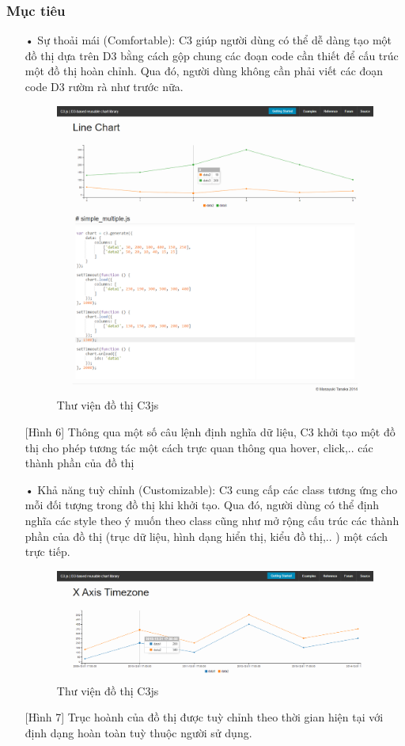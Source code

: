 \documentclass[12pt,a4paper,oneside]{article}
\begin{document}
\subsubsection{Mục tiêu}
\begin{itemize}
        \item[•]Sự thoải mái (Comfortable):
        C3 giúp người dùng có thể dễ dàng tạo một đồ thị dựa trên D3 bằng cách gộp chung các đoạn code cần thiết để cấu trúc một đồ thị hoàn chỉnh. Qua đó, người dùng không cần phải viết các đoạn code D3 rườm rà như trước nữa.
\begin{figure}[htp]
    \includegraphics[scale=.3]{image/c3syntax}
    \caption{Thư viện đồ thị C3js}
    \label{refhinh6}
\end{figure}
[Hình 6] Thông qua một số câu lệnh định nghĩa dữ liệu, C3 khởi tạo một đồ thị cho phép tương tác một cách trực quan thông qua hover, click,.. các thành phần của đồ thị

        \item[•]Khả năng tuỳ chỉnh (Customizable):
        C3 cung cấp các class tương ứng cho mỗi đối tượng trong đồ thị khi khởi tạo. Qua đó, người dùng có thể định nghĩa các style theo ý muốn theo class cũng như mở rộng cấu trúc các thành phần của đồ thị (trục dữ liệu, hình dạng hiển thị, kiểu đồ thị,.. ) một cách trực tiếp.
\begin{figure}[htp]
    \includegraphics[scale=.4]{image/c3custom}
    \caption{Thư viện đồ thị C3js}
    \label{refhinh7}
\end{figure}      
[Hình 7] Trục hoành của đồ thị được tuỳ chỉnh theo thời gian hiện tại với định dạng hoàn toàn tuỳ thuộc người sử dụng.
 

\end{itemize}
\end{document}
